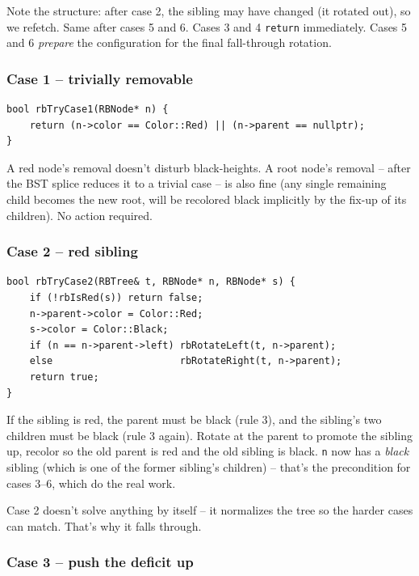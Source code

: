 \documentclass[11pt]{article}
\begin{document}
Note the structure: after case 2, the sibling may have changed (it rotated out), so we refetch. Same after cases 5 and 6. Cases 3 and 4 \texttt{return} immediately. Cases 5 and 6 \emph{prepare} the configuration for the final fall-through rotation.

\subsubsection*{Case 1 -- trivially removable}

\begin{lstlisting}[basicstyle=\ttfamily\small,frame=single]
bool rbTryCase1(RBNode* n) {
    return (n->color == Color::Red) || (n->parent == nullptr);
}
\end{lstlisting}

A red node's removal doesn't disturb black-heights. A root node's removal -- after the BST splice reduces it to a trivial case -- is also fine (any single remaining child becomes the new root, will be recolored black implicitly by the fix-up of its children). No action required.

\subsubsection*{Case 2 -- red sibling}

\begin{lstlisting}[basicstyle=\ttfamily\small,frame=single]
bool rbTryCase2(RBTree& t, RBNode* n, RBNode* s) {
    if (!rbIsRed(s)) return false;
    n->parent->color = Color::Red;
    s->color = Color::Black;
    if (n == n->parent->left) rbRotateLeft(t, n->parent);
    else                      rbRotateRight(t, n->parent);
    return true;
}
\end{lstlisting}

If the sibling is red, the parent must be black (rule 3), and the sibling's two children must be black (rule 3 again). Rotate at the parent to promote the sibling up, recolor so the old parent is red and the old sibling is black. \texttt{n} now has a \emph{black} sibling (which is one of the former sibling's children) -- that's the precondition for cases 3--6, which do the real work.

\begin{notebox}
Case 2 doesn't solve anything by itself -- it normalizes the tree so the harder cases can match. That's why it falls through.
\end{notebox}

\subsubsection*{Case 3 -- push the deficit up}
\end{document}
